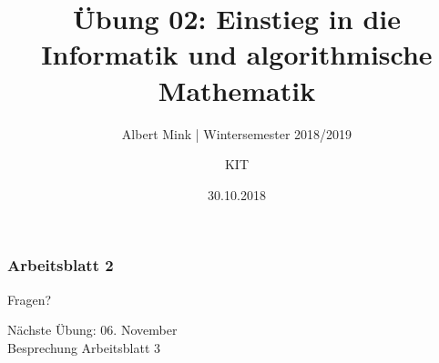 \documentclass[c,18pt]{beamer}
\date{30.10.2018}
\title[Übung 02: Einstieg in die Informatik und algorithmische Mathematik]
  {Übung 02: Einstieg in die Informatik und algorithmische Mathematik}
\subtitle{Albert Mink | Wintersemester 2018/2019}
\author[Albert Mink, ]{KIT}
\institute[Institut für Angewandte und Numerische Mathematik (IANM)]{Institut für Angewandte und Numerische Mathematik}
\begin{document}
\begin{frame}
  \maketitle
\end{frame}
\begin{frame}
  \frametitle{Arbeitsblatt 2}%
\tableofcontents
\end{frame}
\setcounter{exercise}{5}



\setcounter{exercise}{6}




\setcounter{exercise}{7}







\setcounter{exercise}{8}


\begin{frame}
\centering
\Huge\textcolor{KITgreen}{Fragen?}
\vspace{2cm}

{\LARGE
N\"achste \"Ubung: 06. November\\
Besprechung Arbeitsblatt 3
}
\end{frame}


\end{document}
